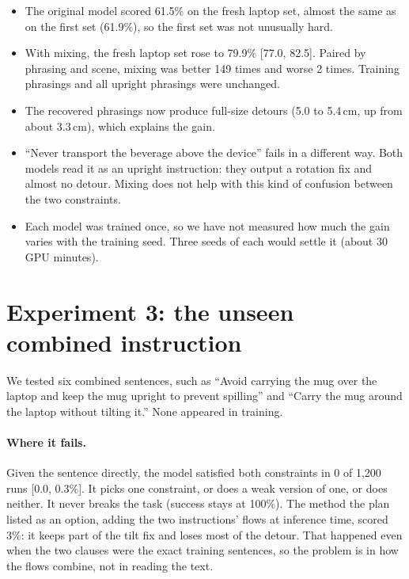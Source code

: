 \documentclass[11pt]{article}
\begin{document}
\begin{itemize}
  \item The original model scored 61.5\% on the fresh laptop set, almost the same as on the
        first set (61.9\%), so the first set was not unusually hard.
  \item With mixing, the fresh laptop set rose to 79.9\% [77.0, 82.5]. Paired by phrasing and
        scene, mixing was better 149 times and worse 2 times. Training phrasings and all upright
        phrasings were unchanged.
  \item The recovered phrasings now produce full-size detours (5.0 to 5.4\,cm, up from about
        3.3\,cm), which explains the gain.
  \item ``Never transport the beverage above the device'' fails in a different way. Both models
        read it as an upright instruction: they output a rotation fix and almost no detour.
        Mixing does not help with this kind of confusion between the two constraints.
  \item Each model was trained once, so we have not measured how much the gain varies with the
        training seed. Three seeds of each would settle it (about 30 GPU minutes).
\end{itemize}

\section{Experiment 3: the unseen combined instruction}
\label{sec:exp3}

We tested six combined sentences, such as ``Avoid carrying the mug over the laptop and keep the
mug upright to prevent spilling'' and ``Carry the mug around the laptop without tilting it.''
None appeared in training.

\paragraph{Where it fails.} Given the sentence directly, the model satisfied both constraints in
0 of 1{,}200 runs [0.0, 0.3\%]. It picks one constraint, or does a weak version of one, or does
neither. It never breaks the task (success stays at 100\%). The method the plan listed as an
option, adding the two instructions' flows at inference time, scored 3\%: it keeps part of the
tilt fix and loses most of the detour. That happened even when the two clauses were the exact
training sentences, so the problem is in how the flows combine, not in reading the text.
\end{document}
